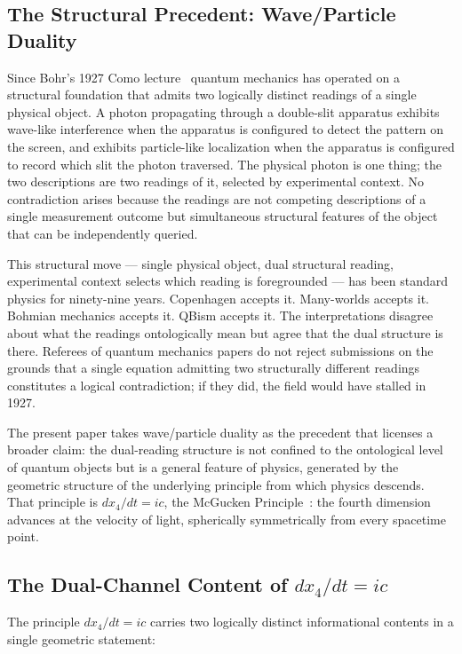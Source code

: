 \documentclass[11pt,a4paper]{article}
\begin{document}
\subsection{The Structural Precedent: Wave/Particle Duality}

Since Bohr's 1927 Como lecture~\cite{bohr1928} quantum mechanics has operated on a structural foundation that admits two logically distinct readings of a single physical object. A photon propagating through a double-slit apparatus exhibits wave-like interference when the apparatus is configured to detect the pattern on the screen, and exhibits particle-like localization when the apparatus is configured to record which slit the photon traversed. The physical photon is one thing; the two descriptions are two readings of it, selected by experimental context. No contradiction arises because the readings are not competing descriptions of a single measurement outcome but simultaneous structural features of the object that can be independently queried.

This structural move --- single physical object, dual structural reading, experimental context selects which reading is foregrounded --- has been standard physics for ninety-nine years. Copenhagen accepts it. Many-worlds accepts it. Bohmian mechanics accepts it. QBism accepts it. The interpretations disagree about what the readings ontologically mean but agree that the dual structure is there. Referees of quantum mechanics papers do not reject submissions on the grounds that a single equation admitting two structurally different readings constitutes a logical contradiction; if they did, the field would have stalled in 1927.

The present paper takes wave/particle duality as the precedent that licenses a broader claim: the dual-reading structure is not confined to the ontological level of quantum objects but is a general feature of physics, generated by the geometric structure of the underlying principle from which physics descends. That principle is $dx_4/dt = ic$, the McGucken Principle~\cite{mcguckenfqxi,mcguckenbook}: the fourth dimension advances at the velocity of light, spherically symmetrically from every spacetime point.

\subsection{The Dual-Channel Content of $dx_4/dt = ic$}

The principle $dx_4/dt = ic$ carries two logically distinct informational contents in a single geometric statement:
\end{document}
